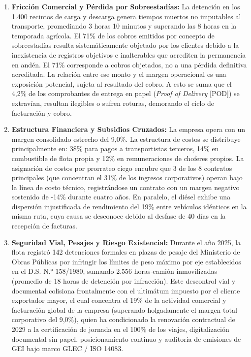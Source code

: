 \begin{enumerate}
  \item \textbf{Fricción Comercial y Pérdida por Sobreestadías:} La detención en los 1.400 recintos de carga y descarga genera tiempos muertos no imputables al transporte, promediando 3 horas 10 minutos y superando las 8 horas en la temporada agrícola. El 71\% de los cobros emitidos por concepto de sobreestadías resulta sistemáticamente objetado por los clientes debido a la inexistencia de registros objetivos e inalterables que acrediten la permanencia en andén. El 71\% corresponde a cobros objetados, no a una pérdida definitiva acreditada. La relación entre ese monto y el margen operacional es una exposición potencial, sujeta al resultado del cobro. A esto se suma que el 4,2\% de los comprobantes de entrega en papel (\textit{Proof of Delivery} [POD]) se extravían, resultan ilegibles o sufren roturas, demorando el ciclo de facturación y cobro.
  \item \textbf{Estructura Financiera y Subsidios Cruzados:} La empresa opera con un margen consolidado estrecho del 9,0\%. La estructura de costos se distribuye principalmente en: 38\% para pagos a transportistas terceros, 14\% en combustible de flota propia y 12\% en remuneraciones de choferes propios. La asignación de costos por prorrateo ciego encubre que 3 de los 8 contratos principales (que concentran el 31\% de los ingresos corporativos) operan bajo la línea de costo técnico, registrándose un contrato con un margen negativo sostenido de -14\% durante cuatro años. En paralelo, el diésel exhibe una dispersión injustificada de rendimiento del 19\% entre vehículos idénticos en la misma ruta, cuya causa se desconoce debido al desfase de 40 días en la recepción de facturas.
  \item \textbf{Seguridad Vial, Pesajes y Riesgo Existencial:} Durante el año 2025, la flota registró 142 detenciones formales en plazas de pesaje del Ministerio de Obras Públicas por infringir los límites de peso máximo por eje establecidos en el D.S. N.° 158/1980, sumando 2.556 horas-camión inmovilizadas (promedio de 18 horas de detención por infracción). Este descontrol vial y documental colisiona frontalmente con el ultimátum impuesto por el cliente exportador mayor, el cual concentra el 19\% de la actividad comercial y facturación global de la empresa (superando holgadamente el margen total corporativo del 9,0\%), quien ha condicionado la renovación contractual de 2029 a la certificación de jornada en el 100\% de los viajes, digitalización documental sin papel, posicionamiento continuo y auditoría de emisiones de GEI bajo marco GLEC / ISO 14083.
\end{enumerate}

